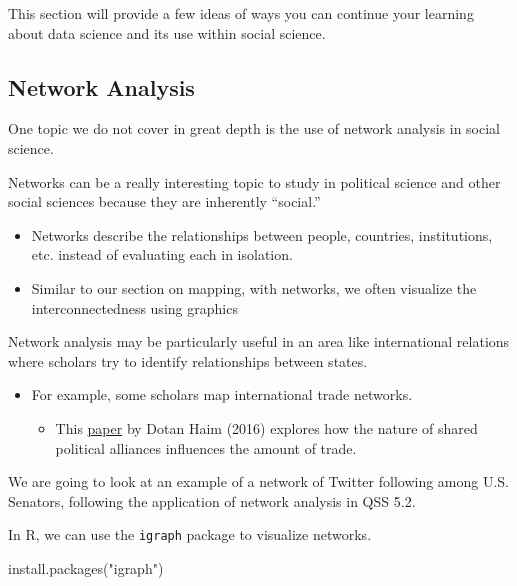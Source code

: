 \documentclass[
  letterpaper,
  DIV=11,
  numbers=noendperiod]{scrreprt}
\newenvironment{Shaded}{\begin{snugshade}}{\end{snugshade}}
\newcommand{\FunctionTok}[1]{\textcolor[rgb]{0.28,0.35,0.67}{#1}}
\newcommand{\NormalTok}[1]{\textcolor[rgb]{0.00,0.23,0.31}{#1}}
\newcommand{\StringTok}[1]{\textcolor[rgb]{0.13,0.47,0.30}{#1}}
\providecommand{\tightlist}{%
  \setlength{\itemsep}{0pt}\setlength{\parskip}{0pt}}\usepackage{longtable,booktabs,array}
\begin{document}
This section will provide a few ideas of ways you can continue your
learning about data science and its use within social science.

\hypertarget{network-analysis}{%
\subsection{Network Analysis}\label{network-analysis}}

One topic we do not cover in great depth is the use of network analysis
in social science.

Networks can be a really interesting topic to study in political science
and other social sciences because they are inherently ``social.''

\begin{itemize}
\tightlist
\item
  Networks describe the relationships between people, countries,
  institutions, etc. instead of evaluating each in isolation.
\item
  Similar to our section on mapping, with networks, we often visualize
  the interconnectedness using graphics
\end{itemize}

Network analysis may be particularly useful in an area like
international relations where scholars try to identify relationships
between states.

\begin{itemize}
\tightlist
\item
  For example, some scholars map international trade networks.

  \begin{itemize}
  \tightlist
  \item
    This \href{https://www.jstor.org/stable/43920602}{paper} by Dotan
    Haim (2016) explores how the nature of shared political alliances
    influences the amount of trade.
  \end{itemize}
\end{itemize}

We are going to look at an example of a network of Twitter following
among U.S. Senators, following the application of network analysis in
QSS 5.2.

In R, we can use the \texttt{igraph} package to visualize networks.

\begin{Shaded}
\begin{Highlighting}[]
\FunctionTok{install.packages}\NormalTok{(}\StringTok{"igraph"}\NormalTok{)}
\end{Highlighting}
\end{Shaded}
\end{document}
